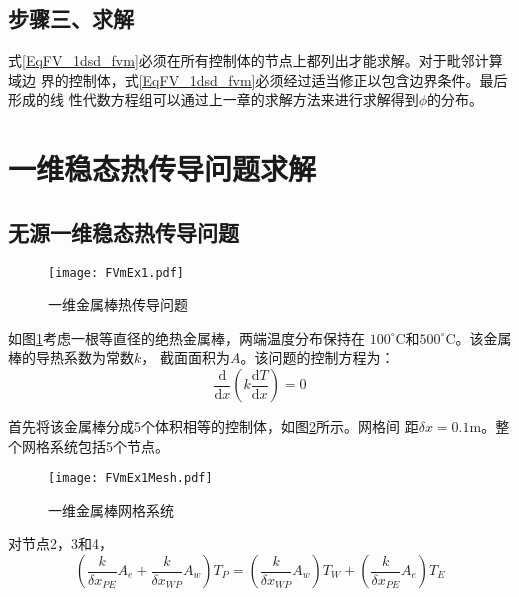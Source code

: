 \subsection{步骤三、求解}
式\eqref{EqFV_1dsd_fvm}必须在所有控制体的节点上都列出才能求解。对于毗邻计算域边
界的控制体，式\eqref{EqFV_1dsd_fvm}必须经过适当修正以包含边界条件。最后形成的线
性代数方程组可以通过上一章的求解方法来进行求解得到$\phi$的分布。

\section{一维稳态热传导问题求解}
\subsection{无源一维稳态热传导问题}
\begin{figure}[h]
  \centering
  \texttt{[image: FVmEx1.pdf]}
  \caption{一维金属棒热传导问题}
  \label{FgFV_ex1}
\end{figure}

如图\ref{FgFV_ex1}考虑一根等直径的绝热金属棒，两端温度分布保持在
$100^{\circ}\mathrm{C}$和$500^{\circ}\mathrm{C}$。该金属棒的导热系数为常数$k$，
截面面积为$A$。该问题的控制方程为：
\begin{equation}
\frac{\mathrm{d} }{\mathrm{d} x}
\left(
k\frac{\mathrm{d} T}{\mathrm{d} x}
\right)
=
0
\label{EqFV_1dsd_ex1_gov}
\end{equation}

首先将该金属棒分成5个体积相等的控制体，如图\ref{FgFV_ex1_grid}所示。网格间
距$\delta x=0.1\mathrm{m}$。整个网格系统包括5个节点。
\begin{figure}[h]
  \centering
  \texttt{[image: FVmEx1Mesh.pdf]}
  \caption{一维金属棒网格系统}
  \label{FgFV_ex1_grid}
\end{figure}

对节点2，3和4，
\begin{equation}
  \left(
    \frac{k}{\delta x_{PE}}A_{e}
    +
    \frac{k}{\delta x_{WP}}A_{w}
  \right)
  T_{P}
  =
  \left(
    \frac{k}{\delta x_{WP}}A_{w}
  \right)
  T_{W}
  +
  \left(
    \frac{k}{\delta x_{PE}}A_{e}
  \right)
  T_{E}
\end{equation}

